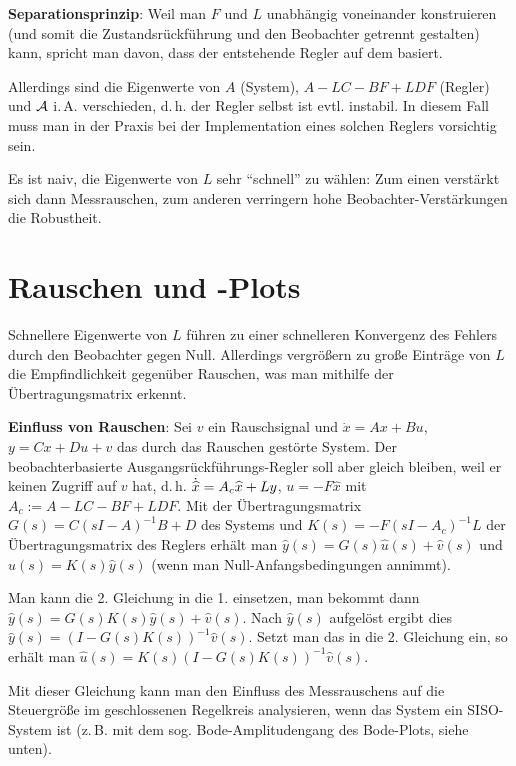 \textbf{Separationsprinzip}:
Weil man $F$ und $L$ unabhängig voneinander konstruieren
(und somit die Zustandsrückführung und den Beobachter getrennt gestalten) kann,
spricht man davon, dass der entstehende Regler auf dem
 basiert.

Allerdings sind die Eigenwerte von $A$ (System), $A - LC - BF + LDF$ (Regler) und $\mathcal{A}$ i.\,A.
verschieden, d.\,h. der Regler selbst ist evtl. instabil.
In diesem Fall muss man in der Praxis bei der Implementation eines solchen Reglers vorsichtig
sein.

Es ist naiv, die Eigenwerte von $L$ sehr "`schnell"' zu wählen:
Zum einen verstärkt sich dann Messrauschen, zum anderen verringern hohe Beobachter-Verstärkungen
die Robustheit.

\pagebreak

\section{%
    Rauschen und -Plots%
}

Schnellere Eigenwerte von $L$ führen zu einer schnelleren Konvergenz des Fehlers durch den
Beobachter gegen Null.
Allerdings vergrößern zu große Einträge von $L$ die Empfindlichkeit gegenüber Rauschen,
was man mithilfe der Übertragungsmatrix erkennt.

\textbf{Einfluss von Rauschen}:
Sei $v$ ein Rauschsignal und $\dot{x} = Ax + Bu$, $y = Cx + Du + v$ das durch das Rauschen
gestörte System.
Der beobachterbasierte Ausgangsrückführungs-Regler soll aber gleich bleiben, weil er keinen
Zugriff auf $v$ hat, d.\,h.
$\dotwidehat{x} = A_c \widehat{x} + Ly$, $u = -F\widehat{x}$
mit $A_c := A - LC - BF + LDF$.
Mit der Übertragungsmatrix $G(s) = C (sI - A)^{-1} B + D$ des Systems und
$K(s) = -F(sI - A_c)^{-1} L$ der Übertragungsmatrix des Reglers erhält man
$\widehat{y}(s) = G(s) \widehat{u}(s) + \widehat{v}(s)$ und
$\widehat{u}(s) = K(s) \widehat{y}(s)$
(wenn man Null-Anfangsbedingungen annimmt).

Man kann die 2. Gleichung in die 1. einsetzen,
man bekommt dann $\widehat{y}(s) = G(s)K(s) \widehat{y}(s) + \widehat{v}(s)$.
Nach $\widehat{y}(s)$ aufgelöst ergibt dies
$\widehat{y}(s) = (I - G(s)K(s))^{-1} \widehat{v}(s)$.
Setzt man das in die 2. Gleichung ein, so erhält man
$\widehat{u}(s) = K(s) (I - G(s)K(s))^{-1} \widehat{v}(s)$.

Mit dieser Gleichung kann man den Einfluss des Messrauschens auf die Steuergröße im geschlossenen
Regelkreis analysieren, wenn das System ein SISO-System ist
(z.\,B. mit dem sog. Bode-Amplitudengang des Bode-Plots, siehe unten).

